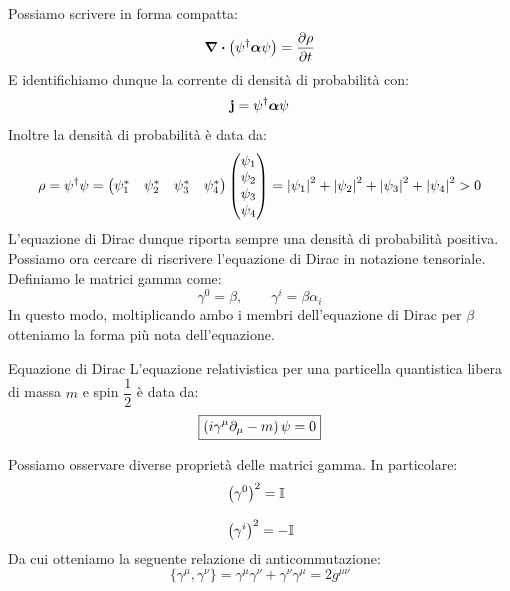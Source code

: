 Possiamo scrivere in forma compatta:
\begin{equation}
  \divergence{\brackets{\psi^\dagger\vecsymb{\alpha}\psi}} = \pdv{\rho}{t}
\end{equation}
E identifichiamo dunque la corrente di densità di probabilità con:
\begin{equation}
  \vb{j} = \psi^\dagger\boldsymbol{\alpha}\psi
\end{equation}
Inoltre la densità di probabilità è data da:
\begin{equation}
  \rho = \psi^\dagger \psi = \begin{pmatrix}
    \psi_1^* & \psi_2^* & \psi_3^* & \psi_4^*
  \end{pmatrix}
  \begin{pmatrix}
    \psi_1 \\ \psi_2 \\ \psi_3 \\ \psi_4
  \end{pmatrix} = \abs{\psi_1}^2 + \abs{\psi_2}^2 + \abs{\psi_3}^2 + \abs{\psi_4}^2 > 0
\end{equation}
L'equazione di Dirac dunque riporta sempre una densità di probabilità positiva.
Possiamo ora cercare di riscrivere l'equazione di Dirac in notazione tensoriale. Definiamo le matrici gamma come:
\begin{equation}
  \gamma^0 = \beta, \qquad \gamma^i = \beta \alpha_i
\end{equation}
In questo modo, moltiplicando ambo i membri dell'equazione di Dirac per $\beta$ otteniamo la forma più nota dell'equazione.
\begin{theorem}{Equazione di Dirac}
    L'equazione relativistica per una particella quantistica libera di massa $m$ e spin $\dfrac{1}{2}$ è data da:
    \begin{equation}
        \boxed{\left(i\gamma^\mu \partial_\mu - m\right)\psi = 0}
    \end{equation}
\end{theorem}
Possiamo osservare diverse proprietà delle matrici gamma. In particolare:
\begin{equation}
  \begin{split}
    &\left(\gamma^0\right)^2 = \mathbb{I}\\[8pt]
    &\left(\gamma^i\right)^2 = -\mathbb{I}
  \end{split}
\end{equation}
Da cui otteniamo la seguente relazione di anticommutazione:
\begin{equation}
  \{\gamma^\mu, \gamma^\nu\} = \gamma^\mu \gamma^\nu + \gamma^\nu \gamma^\mu = 2 g^{\mu \nu}
\end{equation}
